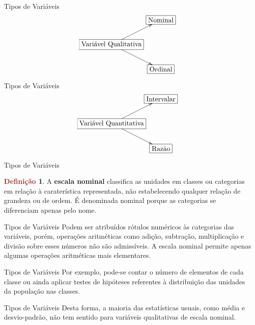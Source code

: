 \documentclass[10pt]{beamer}
\renewcommand{\indent}{\hspace*{2em}}
\theoremstyle{definition}
\newtheorem{defn}{\textcolor{brown}{Definição}}[section]
\begin{document}
\begin{frame}{Tipos de Variáveis}
$$\xymatrix@!=1pc{
& &*+[F]{\mbox{Nominal}}\\ 
*+[F]{\mbox{Variável Qualitativa}}\ar[drr]\ar[urr] & & \\
& & *+[F]{\mbox{Ordinal}}
}$$
\end{frame}

\begin{frame}{Tipos de Variáveis}
$$\xymatrix@!=1pc{
& & *+[F]{\mbox{Intervalar}}\\ 
*+[F]{\mbox{Variável Quantitativa}}\ar[drr]\ar[urr] & & \\
& & *+[F]{\mbox{Razão}}
}$$
\end{frame}

\begin{frame}{Tipos de Variáveis}
\begin{defn}
\vfill\indent A \textbf{escala nominal} classifica as unidades em classes ou categorias em relação à caraterística representada, não estabelecendo qualquer relação de grandeza ou de ordem. É denominada nominal porque as categorias se diferenciam apenas pelo nome.
\end{defn}
\end{frame}

\begin{frame}{Tipos de Variáveis}
\indent Podem ser atribuídos rótulos numéricos às categorias das variáveis, porém, operações aritméticas como adição, subtração, multiplicação e divisão sobre esses números não são admissíveis. A escala nominal permite apenas algumas operações aritméticas mais elementares.
\end{frame}

\begin{frame}{Tipos de Variáveis}
\indent Por exemplo, pode-se contar o número de elementos de cada classe ou ainda aplicar testes de hipóteses referentes à distribuição das unidades da população nas classes.
\end{frame}

\begin{frame}{Tipos de Variáveis}
\indent Desta forma, a maioria das estatísticas usuais, como média e desvio-padrão, não tem sentido para variáveis qualitativas de escala nominal.
\end{frame}
\end{document}
